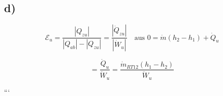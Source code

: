 

\subsection*{d)}

\[
\mathcal{E}_u = \frac{|Q_{zu}|}{|Q_{ab}| - |Q_{zu}|} = \frac{| \dot{Q}_{zu} |}{| \dot{W}_u |} \quad \text{aus } 0 = \dot{m}(h_2 - h_1) + \dot{Q}_u
\]

\[
= \frac{\dot{Q}_u}{\dot{W}_u} = \frac{\dot{m}_{RT12} (h_1 - h_2)}{\dot{W}_u}
\]

```